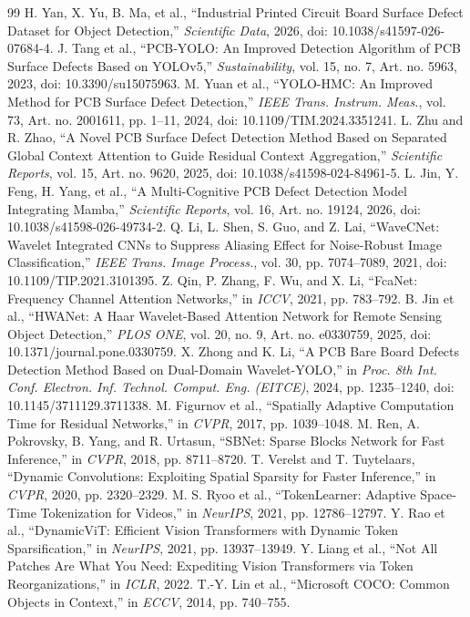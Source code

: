 \documentclass[conference]{IEEEtran}
\begin{document}
\begin{thebibliography}{99}
 H. Yan, X. Yu, B. Ma, et al., ``Industrial Printed Circuit Board Surface Defect Dataset for Object Detection,'' \textit{Scientific Data}, 2026, doi: 10.1038/s41597-026-07684-4.
 J. Tang et al., ``PCB-YOLO: An Improved Detection Algorithm of PCB Surface Defects Based on YOLOv5,'' \textit{Sustainability}, vol. 15, no. 7, Art. no. 5963, 2023, doi: 10.3390/su15075963.
 M. Yuan et al., ``YOLO-HMC: An Improved Method for PCB Surface Defect Detection,'' \textit{IEEE Trans. Instrum. Meas.}, vol. 73, Art. no. 2001611, pp. 1--11, 2024, doi: 10.1109/TIM.2024.3351241.
 L. Zhu and R. Zhao, ``A Novel PCB Surface Defect Detection Method Based on Separated Global Context Attention to Guide Residual Context Aggregation,'' \textit{Scientific Reports}, vol. 15, Art. no. 9620, 2025, doi: 10.1038/s41598-024-84961-5.
 L. Jin, Y. Feng, H. Yang, et al., ``A Multi-Cognitive PCB Defect Detection Model Integrating Mamba,'' \textit{Scientific Reports}, vol. 16, Art. no. 19124, 2026, doi: 10.1038/s41598-026-49734-2.
 Q. Li, L. Shen, S. Guo, and Z. Lai, ``WaveCNet: Wavelet Integrated CNNs to Suppress Aliasing Effect for Noise-Robust Image Classification,'' \textit{IEEE Trans. Image Process.}, vol. 30, pp. 7074--7089, 2021, doi: 10.1109/TIP.2021.3101395.
 Z. Qin, P. Zhang, F. Wu, and X. Li, ``FcaNet: Frequency Channel Attention Networks,'' in \textit{ICCV}, 2021, pp. 783--792.
 B. Jin et al., ``HWANet: A Haar Wavelet-Based Attention Network for Remote Sensing Object Detection,'' \textit{PLOS ONE}, vol. 20, no. 9, Art. no. e0330759, 2025, doi: 10.1371/journal.pone.0330759.
 X. Zhong and K. Li, ``A PCB Bare Board Defects Detection Method Based on Dual-Domain Wavelet-YOLO,'' in \textit{Proc. 8th Int. Conf. Electron. Inf. Technol. Comput. Eng. (EITCE)}, 2024, pp. 1235--1240, doi: 10.1145/3711129.3711338.
 M. Figurnov et al., ``Spatially Adaptive Computation Time for Residual Networks,'' in \textit{CVPR}, 2017, pp. 1039--1048.
 M. Ren, A. Pokrovsky, B. Yang, and R. Urtasun, ``SBNet: Sparse Blocks Network for Fast Inference,'' in \textit{CVPR}, 2018, pp. 8711--8720.
 T. Verelst and T. Tuytelaars, ``Dynamic Convolutions: Exploiting Spatial Sparsity for Faster Inference,'' in \textit{CVPR}, 2020, pp. 2320--2329.
 M. S. Ryoo et al., ``TokenLearner: Adaptive Space-Time Tokenization for Videos,'' in \textit{NeurIPS}, 2021, pp. 12786--12797.
 Y. Rao et al., ``DynamicViT: Efficient Vision Transformers with Dynamic Token Sparsification,'' in \textit{NeurIPS}, 2021, pp. 13937--13949.
 Y. Liang et al., ``Not All Patches Are What You Need: Expediting Vision Transformers via Token Reorganizations,'' in \textit{ICLR}, 2022.
 T.-Y. Lin et al., ``Microsoft COCO: Common Objects in Context,'' in \textit{ECCV}, 2014, pp. 740--755.
\end{thebibliography}
\end{document}

